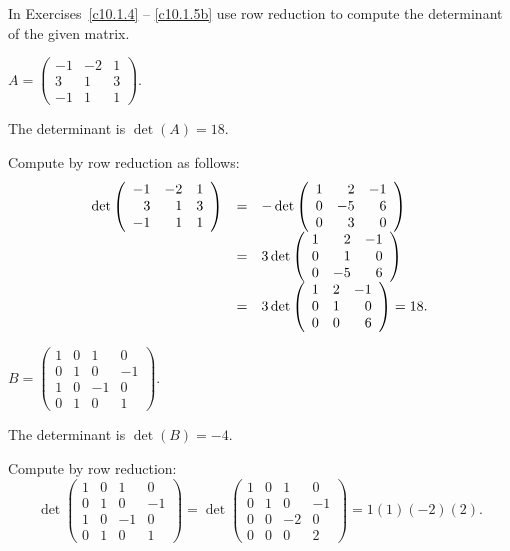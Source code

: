 \documentclass{ximera}
\begin{document}
\noindent In Exercises~\ref{c10.1.4} -- \ref{c10.1.5b} use row reduction 
to compute the determinant of the given matrix.
\begin{exercise} \label{c10.1.4}
$A = \left(\begin{array}{rrr} -1 & -2 & 1 \\ 3 & 1 & 3 \\ -1 & 1 & 1
\end{array} \right)$. 

\begin{solution}

\ans The determinant is $\det(A) = 18$. 

\soln Compute by row reduction as follows:
\[
\begin{array}{rcl}
\det\left(\begin{array}{rrr} -1 & -2 & 1 \\ 3 & 1 & 3 \\ -1 & 1 & 1\end{array}\right)
& = & -\det\left(\begin{array}{rrr} 1 & 2 & -1 \\ 0 & -5 & 6 \\ 0 & 3 & 0\end{array}\right) \\
& = & 3\det\left(\begin{array}{rrr} 1 & 2 & -1 \\ 0 & 1 & 0 \\ 0 & -5 & 6\end{array}\right) \\
& = & 3\det\left(\begin{array}{rrr} 1 & 2 & -1 \\ 0 & 1 & 0 \\ 0 & 0 & 6\end{array}\right) = 18.
\end{array}
\]

\end{solution}
\end{exercise}
\begin{exercise} \label{c10.1.5a}
$B = \left(\begin{array}{rrrr} 1 & 0 & 1 & 0 \\ 0 & 1 & 0 & -1 \\
1 & 0 & -1 & 0 \\ 0 & 1 & 0 & 1 \end{array}\right)$.

\begin{solution}

\ans The determinant is $\det(B) = -4$.

\soln Compute by row reduction:
\[
\det\left(\begin{array}{rrrr}
1 & 0 & 1 & 0 \\
0 & 1 & 0 & -1 \\
1 & 0 & -1 & 0 \\
0 & 1 & 0 & 1 \end{array}\right)
= \det\left(\begin{array}{rrrr}
1 & 0 & 1 & 0 \\
0 & 1 & 0 & -1 \\
0 & 0 & -2 & 0 \\
0 & 0 & 0 & 2 \end{array}\right)
= 1(1)(-2)(2).
\]

\end{solution}
\end{exercise}
\end{document}
